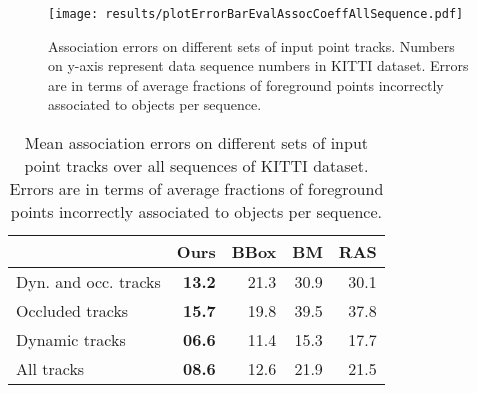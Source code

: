 \begin{figure*}
\texttt{[image: results/plotErrorBarEvalAssocCoeffAllSequence.pdf]}
  \caption{Association errors on different sets of input point tracks. Numbers on y-axis represent data sequence numbers in KITTI dataset. Errors are in terms of average fractions of foreground points incorrectly associated to objects per sequence.}
\label{fig:assoc-occ-results}
\end{figure*}
\begin{table}
\begin{tabular}{lrrrr}
  \toprule
  & Ours & BBox & BM & RAS\\
  \midrule
  Dyn. and occ. tracks        & \textbf{13.2} & 21.3 & 30.9 & 30.1 \\
  Occluded tracks             & \textbf{15.7} & 19.8 & 39.5 & 37.8 \\
  Dynamic tracks              & \textbf{06.6} & 11.4 & 15.3 & 17.7 \\
  All tracks                  & \textbf{08.6} & 12.6 & 21.9 & 21.5 \\
  \bottomrule
\end{tabular}
\caption{Mean association errors on different sets of input point tracks over all sequences of KITTI dataset. Errors are in terms of average fractions of foreground points incorrectly associated to objects per sequence.}
\label{tab:meanAssoc}
\end{table}


